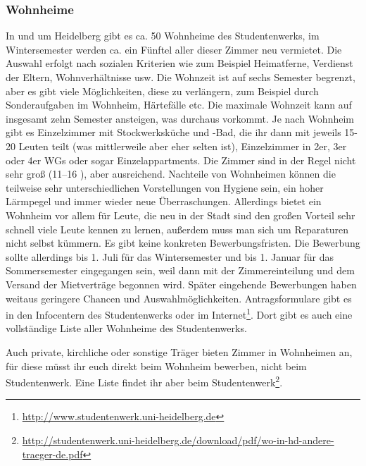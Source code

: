 \subsubsection{Wohnheime}
In und um Heidelberg gibt es ca. 50 Wohnheime des Studentenwerks, im Wintersemester
werden ca. ein Fünftel aller dieser Zimmer neu vermietet. Die Auswahl erfolgt nach
sozialen Kriterien wie zum Beispiel Heimatferne, Verdienst der Eltern,
Wohnverhältnisse usw. Die Wohnzeit ist auf sechs Semester begrenzt, aber es gibt
viele Möglichkeiten, diese zu verlängern, zum Beispiel durch Sonderaufgaben im
Wohnheim, Härtefälle etc. Die maximale Wohnzeit kann auf insgesamt zehn Semester ansteigen, was
durchaus vorkommt. Je nach Wohnheim gibt es Einzelzimmer mit Stockwerksküche und
-Bad, die ihr dann mit jeweils 15-20 Leuten teilt (was mittlerweile aber eher selten
ist), Einzelzimmer in 2er, 3er oder 4er WGs oder sogar Einzelappartments. Die Zimmer
sind in der Regel nicht sehr groß (11--16 \squaren\metre), aber ausreichend. Nachteile von
Wohnheimen können die teilweise sehr unterschiedlichen Vorstellungen von Hygiene
sein, ein hoher Lärmpegel und immer wieder neue Überraschungen. Allerdings bietet
ein Wohnheim vor allem für Leute, die neu in der Stadt sind den großen Vorteil sehr
schnell viele Leute kennen zu lernen, außerdem muss man sich um Reparaturen nicht
selbst kümmern. Es gibt keine konkreten Bewerbungsfristen. Die Bewerbung sollte
allerdings bis 1. Juli für das Wintersemester und bis 1. Januar für das
Sommersemester eingegangen sein, weil dann mit der Zimmereinteilung und dem Versand
der Mietverträge begonnen wird. Später eingehende Bewerbungen haben weitaus
geringere Chancen und Auswahlmöglichkeiten. Antragsformulare gibt es in den
Infocentern des Studentenwerks oder im Internet\footnote{\url{http://www.studentenwerk.uni-heidelberg.de}}.
Dort gibt es auch eine vollständige Liste aller Wohnheime des Studentenwerks.

Auch private, kirchliche oder sonstige Träger bieten Zimmer in Wohnheimen an, für
diese müsst ihr euch direkt beim Wohnheim bewerben, nicht beim Studentenwerk. Eine
Liste findet ihr aber beim Studentenwerk\footnote{\url{http://studentenwerk.uni-heidelberg.de/download/pdf/wo-in-hd-andere-traeger-de.pdf}}.

